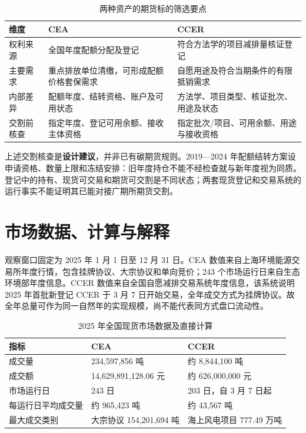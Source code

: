\documentclass[UTF8,a4paper,11pt,oneside,fontset=fandol]{ctexart}
\begin{document}
\begin{table}[htbp]
\centering\small
\caption{两种资产的期货标的筛选要点}
\begin{tabularx}{\textwidth}{@{}L{0.19\textwidth}XX@{}}
\toprule
维度 & CEA & CCER\\
\midrule
权利来源 & 全国年度配额分配及登记 & 符合方法学的项目减排量核证登记\\
主要需求 & 重点排放单位清缴，可形成配额价格套保需求 & 自愿用途及符合当期条件的有限抵销需求\\
内部差异 & 配额年度、结转资格、账户及可用状态 & 方法学、项目类型、核证批次、用途及状态\\
交割前核查 & 指定年度、登记可用余额、接收主体资格 & 指定批次/项目、可用余额、用途与接收资格\\
\bottomrule
\end{tabularx}
\end{table}

上述交割核查是\textbf{设计建议}，并非已有碳期货规则。2019—2024 年配额结转方案设申请资格、数量上限和冻结安排：旧年度持仓不能不经检查就与新年度视为同质\cite{mee2024carryover}。登记中的持有、现货可交易和期货可交割是不同状态；两套现货登记和交易系统的运行事实不能证明其已能对接广期所期货交割。

\section{市场数据、计算与解释}
观察窗口固定为 2025 年 1 月 1 日至 12 月 31 日。CEA 数值来自上海环境能源交易所年度行情，包含挂牌协议、大宗协议和单向竞价；243 个市场运行日来自生态环境部年度信息。CCER 数值来自全国自愿减排交易系统年度信息，该系统说明 2025 年首批新登记 CCER 于 3 月 7 日开始交易，全年成交方式为挂牌协议\cite{she2025annual,mee2026,ccer2025annual}。故全年总量可作为同一自然年的实现规模，尚不能代表同方式盘口流动性。

\begin{table}[htbp]
\centering\small
\caption{2025 年全国现货市场数据及直接计算}
\begin{tabularx}{\textwidth}{@{}L{0.31\textwidth}XX@{}}
\toprule
指标 & CEA & CCER\\
\midrule
成交量 & 234,597,856 吨 & 约 8,844,100 吨\\
成交额 & 14,629,891,128.06 元 & 约 626,000,000 元\\
市场运行日 & 243 日 & 203 日，自 3 月 7 日起\\
每运行日平均成交量 & 约 965,423 吨 & 约 43,567 吨\\
最大成交类别 & 大宗协议 154,201,694 吨 & 海上风电项目 777.49 万吨\\
\bottomrule
\end{tabularx}
\end{table}
\end{document}
